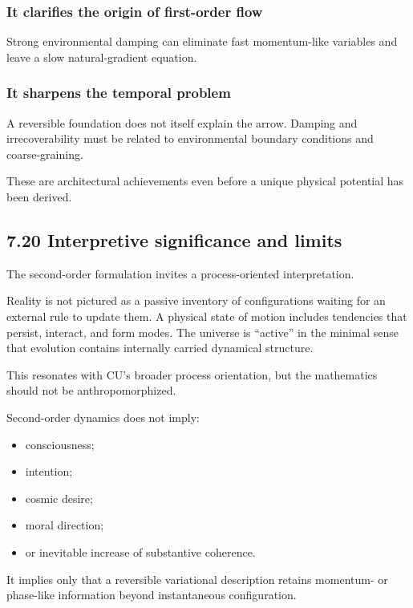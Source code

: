 \documentclass[
  11pt,
]{article}
\providecommand{\tightlist}{%
  \setlength{\itemsep}{0pt}\setlength{\parskip}{0pt}}
\begin{document}
\subsubsection{It clarifies the origin of first-order
flow}\label{it-clarifies-the-origin-of-first-order-flow}

Strong environmental damping can eliminate fast momentum-like variables
and leave a slow natural-gradient equation.

\subsubsection{It sharpens the temporal
problem}\label{it-sharpens-the-temporal-problem}

A reversible foundation does not itself explain the arrow. Damping and
irrecoverability must be related to environmental boundary conditions
and coarse-graining.

These are architectural achievements even before a unique physical
potential has been derived.

\subsection{7.20 Interpretive significance and
limits}\label{interpretive-significance-and-limits}

The second-order formulation invites a process-oriented interpretation.

Reality is not pictured as a passive inventory of configurations waiting
for an external rule to update them. A physical state of motion includes
tendencies that persist, interact, and form modes. The universe is
``active'' in the minimal sense that evolution contains internally
carried dynamical structure.

This resonates with CU's broader process orientation, but the
mathematics should not be anthropomorphized.

Second-order dynamics does not imply:

\begin{itemize}
\tightlist
\item
  consciousness;
\item
  intention;
\item
  cosmic desire;
\item
  moral direction;
\item
  or inevitable increase of substantive coherence.
\end{itemize}

It implies only that a reversible variational description retains
momentum- or phase-like information beyond instantaneous configuration.
\end{document}
